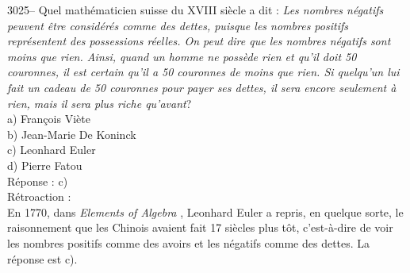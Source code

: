 \documentclass[letterpaper, 12pt]{article}
\begin{document}
3025-- Quel math\'ematicien suisse du {\scriptsize XVIII\ieme{}} si\`ecle a dit : \og \emph{Les nombres n\'egatifs peuvent \^etre consid\'er\'es comme des dettes, puisque les nombres positifs repr\'esentent des possessions r\'eelles. On peut dire que les nombres n\'egatifs sont moins que rien. Ainsi, quand un homme ne poss\`ede rien et qu'il doit 50 couronnes, il est certain qu'il a 50 couronnes de moins que rien. Si quelqu'un lui fait un cadeau de 50 couronnes pour payer ses dettes, il sera encore seulement \`a rien, mais il sera plus riche qu'avant}\fg ?\\[2mm]

a) Fran\c cois Vi\`ete\\
b) Jean-Marie De Koninck\\
c) Leonhard Euler\\
d) Pierre Fatou\\

R\'eponse : c)\\

R\'etroaction :\\
En 1770, dans \og \emph{Elements of Algebra} \fg, Leonhard Euler a repris, en quelque sorte, le raisonnement que les Chinois avaient fait 17 si\`ecles plus t\^ot, c'est-\`a-dire de voir les nombres positifs comme des avoirs et les n\'egatifs comme des dettes. La r\'eponse est c).\\
\end{document}
